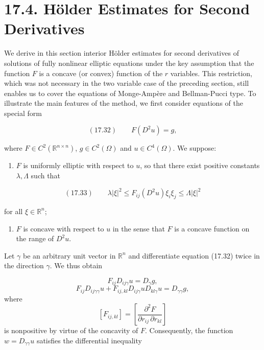 \section*{17.4. Hölder Estimates for Second Derivatives}

We derive in this section interior Hölder estimates for second derivatives of solutions of fully nonlinear elliptic equations under the key assumption that the function $F$ is a concave (or convex) function of the $r$ variables. This restriction, which was not necessary in the two variable case of the preceding section, still enables us to cover the equations of Monge-Ampère and Bellman-Pucci type. To illustrate the main features of the method, we first consider equations of the special form

\begin{equation}
(17.32) \qquad F(D^2u) = g,
\end{equation}

where $F \in C^2(\mathbb{R}^{n \times n})$, $g \in C^2(\Omega)$ and $u \in C^4(\Omega)$. We suppose:

\begin{enumerate}
\item[(i)] $F$ is uniformly elliptic with respect to $u$, so that there exist positive constants $\lambda, \Lambda$ such that
\end{enumerate}

\begin{equation}
(17.33) \qquad \lambda |\xi|^2 \leq F_{ij}(D^2u)\xi_i\xi_j \leq \Lambda |\xi|^2
\end{equation}

for all $\xi \in \mathbb{R}^n$;
\begin{enumerate}
\item[(ii)] $F$ is concave with respect to $u$ in the sense that $F$ is a concave function on the range of $D^2u$.
\end{enumerate}


Let $\gamma$ be an arbitrary unit vector in $\mathbb{R}^n$ and differentiate equation (17.32) twice in the direction $\gamma$. We thus obtain

\begin{equation}\tag{17.34}
F_{ij}D_{ij\gamma}u = D_{\gamma}g,
\end{equation}
\[
F_{ij}D_{ij\gamma\gamma}u + F_{ij,kl}D_{ij\gamma}uD_{kl\gamma}u = D_{\gamma\gamma}g,
\]
where
\[
[F_{ij,kl}] = \left[\frac{\partial^2F}{\partial r_{ij}\,\partial r_{kl}}\right]
\]
is nonpositive by virtue of the concavity of $F$. Consequently, the function $w = D_{\gamma\gamma}u$ satisfies the differential inequality

